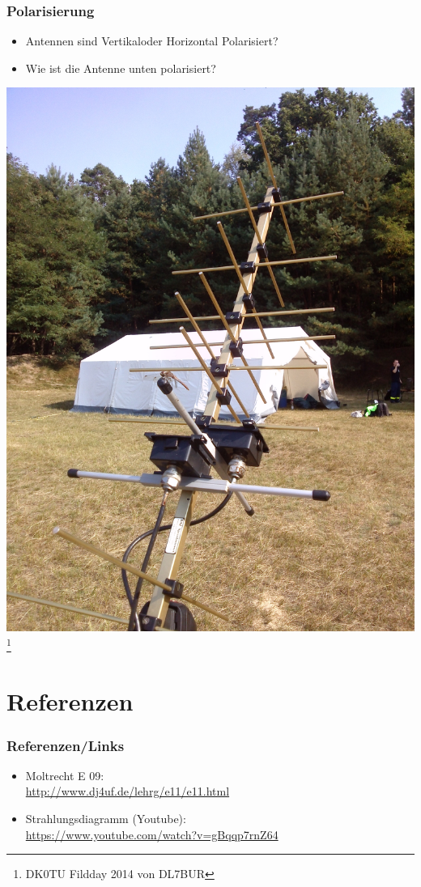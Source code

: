 \begin{frame}
    \frametitle{Polarisierung}
    	\begin{itemize}
		\item Antennen sind Vertikaloder Horizontal Polarisiert?
		\item Wie ist die Antenne unten polarisiert?
    \end{itemize}
    \begin{center}
        \includegraphics[width=.3\textwidth]{e11/kreutzYagi.jpg}
        \footnote{\tiny DK0TU Fildday 2014 von DL7BUR}
	\end{center}
\end{frame}




\section*{Referenzen}

\begin{frame}
    \frametitle{Referenzen/Links}
    
    \footnotesize
    \begin{itemize}
        \item Moltrecht E 09: \\
              \url{http://www.dj4uf.de/lehrg/e11/e11.html}
        \item Strahlungsdiagramm (Youtube): \\
              \url{https://www.youtube.com/watch?v=gBqqp7rnZ64}
    \end{itemize}

\end{frame}




